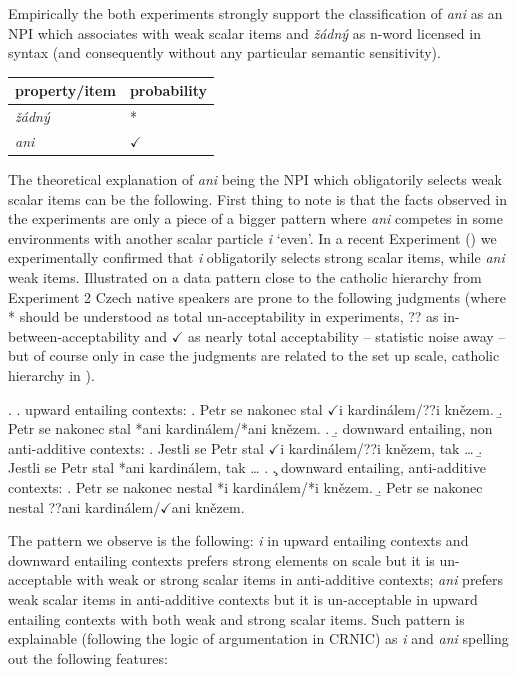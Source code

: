 \documentclass[12pt]{scrartcl}
\begin{document}
Empirically the both experiments strongly support the classification of \textit{ani} as an NPI which associates with weak scalar items and \textit{žádný} as n-word licensed in syntax (and consequently without any particular semantic sensitivity).

\begin{longtable}[]{@{}ll@{}}
\toprule
property/item & probability\tabularnewline
\midrule
\endhead
\emph{žádný} & *\tabularnewline
\emph{ani} & \(\checkmark\)\tabularnewline
\bottomrule
\end{longtable}

The theoretical explanation of \textit{ani} being the NPI which obligatorily selects weak scalar items can be the following. First thing to note is that the facts observed in the experiments are only a piece of a bigger pattern where \textit{ani} competes in some environments with another scalar particle \textit{i} `even'. In a recent Experiment (\citealt{docekalsafratovaoli}) we experimentally confirmed that \textit{i} obligatorily selects strong scalar items, while \textit{ani} weak items. Illustrated on a data pattern close to the catholic hierarchy from Experiment 2 Czech native speakers are prone to the following judgments (where * should be understood as total un-acceptability in experiments, ?? as in-between-acceptability and $\checkmark$ as nearly total acceptability -- statistic noise away -- but of course only in case the judgments are related to the set up scale, catholic hierarchy in \Next).

\ex. \a. upward entailing contexts:
\a. Petr se nakonec stal $\checkmark$i kardinálem/??i knězem.
\b. Petr se nakonec stal *ani kardinálem/*ani knězem.
\z.
\b. downward entailing, non anti-additive contexts:
\a. Jestli se Petr stal $\checkmark$i kardinálem/??i knězem, tak \ldots
\b. Jestli se Petr stal *ani kardinálem, tak \ldots
\z.
\c. downward entailing, anti-additive contexts:
\a. Petr se nakonec nestal *i kardinálem/*i knězem. 
\b. Petr se nakonec nestal ??ani kardinálem/$\checkmark$ani knězem.

The pattern we observe is the following: \textit{i} in upward entailing contexts and downward entailing contexts prefers strong elements on scale but it is un-acceptable with weak or strong scalar items in anti-additive contexts; \textit{ani} prefers weak scalar items in anti-additive contexts but it is un-acceptable in upward entailing contexts with both weak and strong scalar items. Such pattern is explainable (following the logic of argumentation in CRNIC) as \textit{i} and \textit{ani} spelling out the following features:
\end{document}
